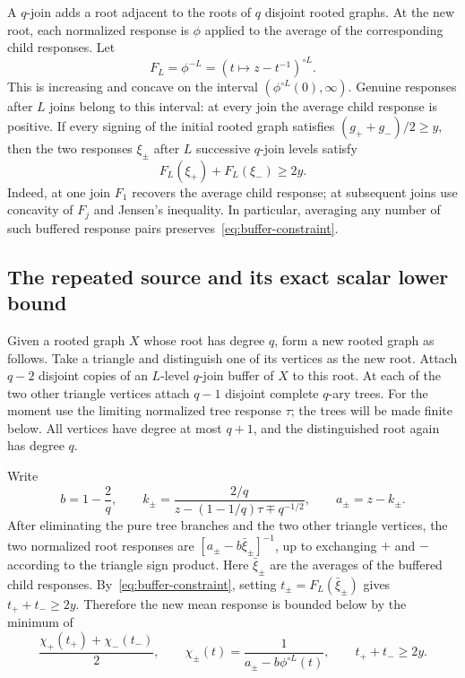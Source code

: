 \documentclass[11pt]{article}
\numberwithin{equation}{section}
\begin{document}
A $q$-join adds a root adjacent to the roots of $q$ disjoint rooted
graphs. At the new root, each normalized response is $\phi$ applied
to the average of the corresponding child responses. Let
\[
 F_L=\phi^{-L}=(t\mapsto z-t^{-1})^{\circ L}.
\]
This is increasing and concave on the interval
$(\phi^{\circ L}(0),\infty)$. Genuine responses after $L$ joins
belong to this interval: at every join the average child response is
positive. If every signing of the initial rooted graph satisfies
$(g_++g_-)/2\ge y$, then the two responses $\xi_\pm$ after $L$
successive $q$-join levels satisfy
\begin{equation}\label{eq:buffer-constraint}
 F_L(\xi_+)+F_L(\xi_-)\ge2y.
\end{equation}
Indeed, at one join $F_1$ recovers the average child response; at
subsequent joins use concavity of $F_j$ and Jensen's inequality.
In particular, averaging any number of such buffered response pairs
preserves~\eqref{eq:buffer-constraint}.

\subsection*{The repeated source and its exact scalar lower bound}

Given a rooted graph $X$ whose root has degree $q$, form a new rooted
graph as follows. Take a triangle and distinguish one of its
vertices as the new root. Attach $q-2$ disjoint copies of an
$L$-level $q$-join buffer of $X$ to this root. At each of the two
other triangle vertices attach $q-1$ disjoint complete $q$-ary trees.
For the moment use the limiting normalized tree response $\tau$;
the trees will be made finite below. All vertices have degree at
most $q+1$, and the distinguished root again has degree $q$.

Write
\[
 b=1-\frac2q,\qquad
 k_\pm=\frac{2/q}{z-(1-1/q)\tau\mp q^{-1/2}},
 \qquad a_\pm=z-k_\pm.
\]
After eliminating the pure tree branches and the two other triangle
vertices, the two normalized root responses are
$[a_\pm-b\bar\xi_\pm]^{-1}$, up to exchanging $+$ and $-$ according
to the triangle sign product. Here $\bar\xi_\pm$ are the averages
of the buffered child responses.
By~\eqref{eq:buffer-constraint}, setting
$t_\pm=F_L(\bar\xi_\pm)$ gives $t_++t_-\ge2y$. Therefore the new
mean response is bounded below by the minimum of
\[
 \frac{\chi_+(t_+)+\chi_-(t_-)}2,
 \qquad
 \chi_\pm(t)=\frac1{a_\pm-b\phi^{\circ L}(t)},
 \qquad t_++t_-\ge2y.
\]
\end{document}
